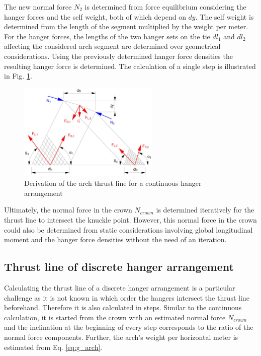 The new normal force $N_2$ is determined from force equilibrium considering the hanger forces and the self weight, both of which depend on $dy$. The self weight is determined from the length of the segment multiplied by the weight per meter. For the hanger forces, the lengths of the two hanger sets on the tie $dl_1$ and $dl_2$ affecting the considered arch segment are determined over geometrical considerations. Using the previously determined hanger force densities the resulting hanger force is determined. The calculation of a single step is illustrated in Fig. \ref{fig:continuous_2}.
\begin{figure}[H]
    \centering
    \includegraphics[width=0.6\textwidth]{overleaf/Appendix/Pictures/continuous_thrust_line.PNG}
    \caption{Derivation of the arch thrust line for a continuous hanger arrangement}
    \label{fig:continuous_2}
\end{figure}

Ultimately, the normal force in the crown $N_{crown}$ is determined iteratively for the thrust line to intersect the knuckle point. However, this normal force in the crown could also be determined from static considerations involving global longitudinal moment and the hanger force densities without the need of an iteration.


\subsection{Thrust line of discrete hanger arrangement}\label{app:discrete}

Calculating the thrust line of a discrete hanger arrangement is a particular challenge as it is not known in which order the hangers intersect the thrust line beforehand. Therefore it is also calculated in steps. Similar to the continuous calculation, it is started from the crown with an estimated normal force $N_{crown}$ and the inclination at the beginning of every step corresponds to the ratio of the normal force components. Further, the arch's weight per horizontal meter is estimated from Eq. \ref{eq:g_arch}.

